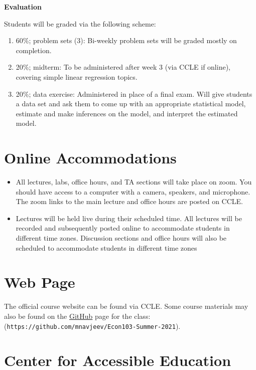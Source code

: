 \documentclass[10pt]{article}
\begin{document}
{\bf \large Evaluation}

Students will be graded via the following scheme:
\begin{enumerate}
  \item 60\%; problem sets (3): Bi-weekly problem sets will be graded mostly on completion.
  \item 20\%; midterm: To be administered after week 3 (via CCLE if online), covering simple linear regression topics.
  \item 20\%; data exercise: Administered in place of a final exam. Will give students a data set and ask them to come up with an appropriate statistical model, estimate and make inferences on the model, and interpret the estimated model.
\end{enumerate}

\section*{Online Accommodations}

\begin{itemize}
	\renewcommand{\labelitemi}{\(\rhd\)}
	\item All lectures, labs, office hours, and TA sections will take place on zoom. You should have access to a computer with a camera, speakers, and microphone. The zoom links to the main lecture and office hours are posted on CCLE. 
	\item Lectures will be held live during their scheduled time. All lectures will be recorded and subsequently posted online to accommodate students in different time zones. Discussion sections and office hours will also be scheduled to accommodate students in different time zones
\end{itemize}

\section*{Web Page}

The official course website can be found via CCLE. Some course materials may also be found on the \href{https://github.com/mnavjeev/Econ103-Summer-2021}{GitHub} page for the class: (\verb|https://github.com/mnavjeev/Econ103-Summer-2021|). 

\section*{Center for Accessible Education}
\end{document}
